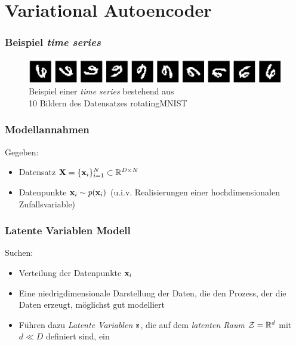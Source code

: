 

\author[Jannis Klingler]{Nix}


\beamertemplatenavigationsymbolsempty{}




\section{Variational Autoencoder}

\begin{frame}
	\frametitle{Beispiel \emph{time series}}
	\begin{figure}[!htbp]
		\includegraphics[scale=0.25]{Bilder/rotatingMNIST}
		\caption{Beispiel einer \emph{time series} bestehend aus \\10 Bildern des Datensatzes rotatingMNIST}
	\end{figure}
\end{frame}

\begin{frame}
	\frametitle{Modellannahmen}
	Gegeben:
	\begin{itemize}
		\item Datensatz $\textbf{X} = \lbrace\mathbf{x}_i \rbrace_{i=1}^{N} \subset \mathbb{R}^{D\times N}$
		\item Datenpunkte $\mathbf{x}_i\sim p(\mathbf{x}_i)$ (u.i.v. Realisierungen einer hochdimensionalen Zufallsvariable)
	\end{itemize}
\end{frame}

\begin{frame}
	\frametitle{Latente Variablen Modell}
	Suchen:
	\begin{itemize}
		\item Verteilung der Datenpunkte $\mathbf{x}_i$
		\item Eine niedrigdimensionale Darstellung der Daten, die den Prozess, der die Daten erzeugt, möglichst gut modelliert
		\item Führen dazu \emph{Latente Variablen} $\mathbf{z}$, die auf dem \emph{latenten Raum} $\mathcal{Z} = \mathbb{R}^d$ mit $d\ll D$ definiert sind, ein
	\end{itemize}
\end{frame}


